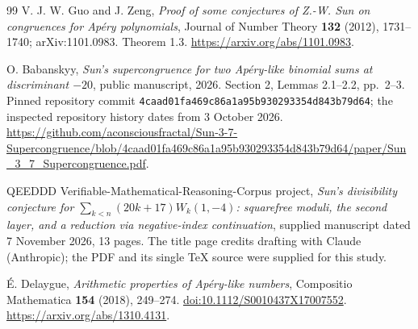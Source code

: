 \documentclass[11pt,a4paper]{article}
\theoremstyle{remark}\newtheorem{remark}[theorem]{Remark}
\begin{document}
\begin{thebibliography}{99}
V. J. W. Guo and J. Zeng, \emph{Proof of some conjectures of Z.-W. Sun
on congruences for Ap\'ery polynomials}, Journal of Number Theory
\textbf{132} (2012), 1731--1740; arXiv:1101.0983.
Theorem 1.3.
\url{https://arxiv.org/abs/1101.0983}.

O. Babanskyy, \emph{Sun's supercongruence for two Ap\'ery-like binomial
sums at discriminant \(-20\)}, public manuscript, 2026.
Section 2, Lemmas 2.1--2.2, pp.~2--3.
Pinned repository commit
\texttt{4caad01fa469c86a1a95b930293354d843b79d64};
the inspected repository history dates from 3 October 2026.
\url{https://github.com/aconsciousfractal/Sun-3-7-Supercongruence/blob/4caad01fa469c86a1a95b930293354d843b79d64/paper/Sun_3_7_Supercongruence.pdf}.


QEEDDD Verifiable-Mathematical-Reasoning-Corpus project,
\emph{Sun's divisibility conjecture for
\(\sum_{k<n}(20k+17)W_k(1,-4)\): squarefree moduli, the second layer,
and a reduction via negative-index continuation},
supplied manuscript dated 7 November 2026, 13 pages.
The title page credits drafting with Claude (Anthropic);
the PDF and its single \TeX{} source were supplied for this study.

\'E. Delaygue, \emph{Arithmetic properties of Ap\'ery-like numbers},
Compositio Mathematica \textbf{154} (2018), 249--274.
\href{https://doi.org/10.1112/S0010437X17007552}{doi:10.1112/S0010437X17007552}.
\url{https://arxiv.org/abs/1310.4131}.

\end{thebibliography}
\end{document}
